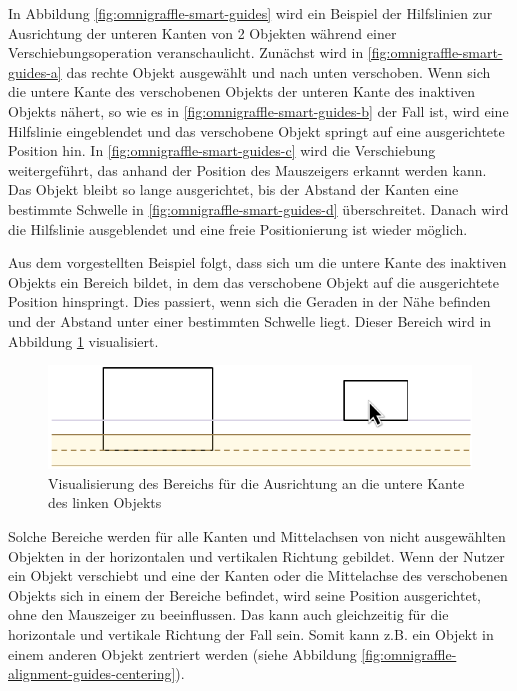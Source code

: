 In Abbildung \ref{fig:omnigraffle-smart-guides} wird ein Beispiel der Hilfslinien zur Ausrichtung der unteren Kanten von 2 Objekten während einer Verschiebungsoperation veranschaulicht. Zunächst wird in \ref{fig:omnigraffle-smart-guides-a} das rechte Objekt ausgewählt und nach unten verschoben. Wenn sich die untere Kante des verschobenen Objekts der unteren Kante des inaktiven Objekts nähert, so wie es in \ref{fig:omnigraffle-smart-guides-b} der Fall ist, wird eine Hilfslinie eingeblendet und das verschobene Objekt springt auf eine ausgerichtete Position hin. In \ref{fig:omnigraffle-smart-guides-c} wird die Verschiebung weitergeführt, das anhand der Position des Mauszeigers erkannt werden kann. Das Objekt bleibt so lange ausgerichtet, bis der Abstand der Kanten eine bestimmte Schwelle in \ref{fig:omnigraffle-smart-guides-d} überschreitet. Danach wird die Hilfslinie ausgeblendet und eine freie Positionierung ist wieder möglich.

Aus dem vorgestellten Beispiel folgt, dass sich um die untere Kante des inaktiven Objekts ein Bereich bildet, in dem das verschobene Objekt auf die ausgerichtete Position hinspringt. Dies passiert, wenn sich die Geraden in der Nähe befinden und der Abstand unter einer bestimmten Schwelle liegt. Dieser Bereich wird in Abbildung \ref{fig:omnigraffle-smart-guides-snap-area} visualisiert.

\begin{figure}[hbt]
    \centering
    \includegraphics{resources/omnigraffle-smart-guides-snap-area}
    \caption{Visualisierung des Bereichs für die Ausrichtung an die untere Kante des linken Objekts}
    \label{fig:omnigraffle-smart-guides-snap-area}
\end{figure}

Solche Bereiche werden für alle Kanten und Mittelachsen von nicht ausgewählten Objekten in der horizontalen und vertikalen Richtung gebildet. Wenn der Nutzer ein Objekt verschiebt und eine der Kanten oder die Mittelachse des verschobenen Objekts sich in einem der Bereiche befindet, wird seine Position ausgerichtet, ohne den Mauszeiger zu beeinflussen. Das kann auch gleichzeitig für die horizontale und vertikale Richtung der Fall sein. Somit kann z.B. ein Objekt in einem anderen Objekt zentriert werden (siehe Abbildung \ref{fig:omnigraffle-alignment-guides-centering}).

